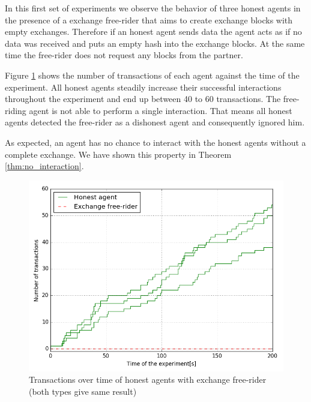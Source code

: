In this first set of experiments we observe the behavior of three honest agents in the presence of 
a exchange free-rider that aims to create exchange blocks with empty exchanges. Therefore if an 
honest agent sends data the agent acts as if no data was received and puts an empty hash into the 
exchange blocks. At the same time the free-rider does not request any blocks from the partner.

Figure \ref{fig:DFR_no_exchanges} shows the number of transactions of each 
agent against the time of the experiment. All honest agents steadily increase their successful 
interactions throughout the experiment and end up between 40 to 60 transactions. The free-riding agent
is not able to perform a single interaction. That means all honest agents detected the free-rider 
as a dishonest agent and consequently ignored him. 

As expected, an agent has no chance to interact with the honest agents without a complete exchange. 
We have shown this property in Theorem \ref{thm:no_interaction}.


\begin{figure}
  \centering
  \includegraphics[width=.6\linewidth]{images/gossip_free-rider}
  \caption{Transactions over time of honest agents with exchange free-rider (both types give same result)}
  \label{fig:DFR_no_exchanges}
\end{figure}



